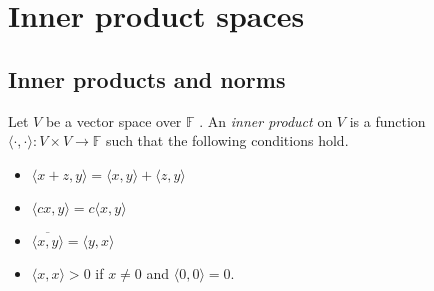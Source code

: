 \documentclass[12pt]{article}
\newenvironment{definition}[2][Definition]{\begin{trivlist}
\item[\hskip \labelsep {\bfseries #1}\hskip \labelsep {\bfseries #2}]}{\end{trivlist}}
\begin{document}
\section{Inner product spaces}

\subsection{Inner products and norms}

\begin{definition}{1}
Let $V$ be a vector space over $\mathbb{F}$ . An \textit{inner product} on $V$ is a function $\langle \cdot, \cdot \rangle : V \times V \to \mathbb{F}$ such that the following conditions hold. 
\begin{itemize}
    \item $\langle x + z, y \rangle = \langle x, y \rangle + \langle z,y \rangle$
    
    \item $\langle cx, y \rangle = c\langle x, y \rangle$
    
    \item $\overline{\langle x, y \rangle} = \langle y, x \rangle$
    
    \item $\langle x, x \rangle > 0$ if $x \neq 0$ and $\langle 0, 0 \rangle = 0$.
\end{itemize}
\end{definition}
\end{document}
